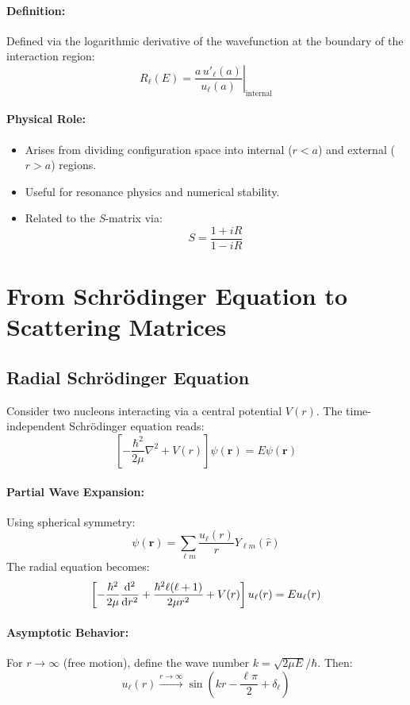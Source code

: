 \documentclass[10pt,a4paper]{article}
\newcommand{\ve}[1]{\mathbf{#1}}
\begin{document}
	\paragraph{Definition:}
	Defined via the logarithmic derivative of the wavefunction at the boundary of the interaction region:
	\[
	R_\ell(E) = \left. \frac{a\, u'_\ell(a)}{u_\ell(a)} \right|_{\text{internal}}
	\]
	
	\paragraph{Physical Role:}
	\begin{itemize}
		\item Arises from dividing configuration space into internal (\( r < a \)) and external (\( r > a \)) regions.
		\item Useful for resonance physics and numerical stability.
		\item Related to the \textit{S}-matrix via:
		\[
		S = \frac{1 + iR}{1 - iR}
		\]
	\end{itemize}
	
	\section{From Schr\"odinger Equation to Scattering Matrices}
	
	\subsection{Radial Schr\"odinger Equation}
	
	Consider two nucleons interacting via a central potential \( V(r) \). The time-independent Schr\"odinger equation reads:
	\[
	\left[ -\frac{\hbar^2}{2\mu} \nabla^2 + V(r) \right] \psi(\ve{r}) = E \psi(\ve{r})
	\]
	
	\paragraph{Partial Wave Expansion:}
	Using spherical symmetry:
	\[
	\psi(\ve{r}) = \sum_{\ell m} \frac{u_\ell(r)}{r} Y_{\ell m}(\hat{r})
	\]
	The radial equation becomes:
	\[
	\left[-\frac{\hbar^2}{2\mu} \dv[2]{r} + \frac{\hbar^2 \ell(\ell+1)}{2\mu r^2} + V(r) \right] u_\ell(r) = E u_\ell(r)
	\]
	
	\paragraph{Asymptotic Behavior:}
	For \( r \to \infty \) (free motion), define the wave number \( k = \sqrt{2\mu E}/\hbar \). Then:
	\[
	u_\ell(r) \xrightarrow{r \to \infty} \sin\left(kr - \frac{\ell\pi}{2} + \delta_\ell\right)
	\]
	
\end{document}
